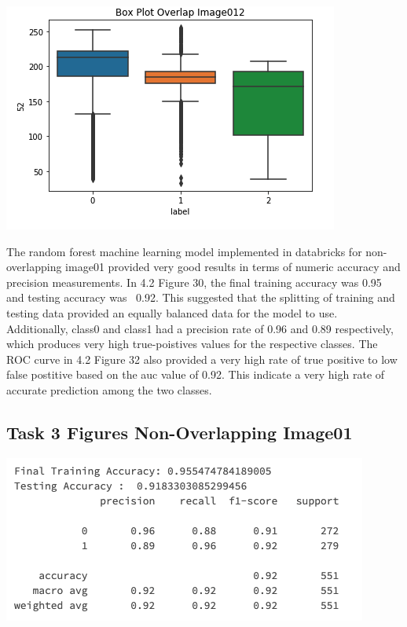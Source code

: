 \documentclass[12pt]{article}
\begin{document}
\begin{multicols*}{2}
\begin{center}
	\includegraphics[scale=0.4]{../screenshot/Pre-Overlapping/box012.png}
  \end{center}

  \hspace*{5mm} The random forest machine learning model implemented in databricks for non-overlapping image01 provided very good results in terms of numeric
  accuracy and precision measurements. In 4.2 Figure 30, the final training accuracy was 0.95 and testing accuracy was ~0.92. This suggested that the splitting of training and testing data provided an equally
  balanced data for the model to use. Additionally, class0 and class1 had a precision rate of 0.96 and 0.89 respectively, which produces very high true-poistives values for the respective classes. 
  The ROC curve in 4.2 Figure 32 also provided a very high rate of true positive to low false postitive based on the auc value of 0.92. This indicate a very high rate of accurate prediction among 
  the two classes.



  \subsection{Task 3 Figures Non-Overlapping Image01}
  \begin{center}
	\includegraphics[scale=0.4]{../screenshot/Non-Overlapping/score01.png}


\end{center}
\end{multicols*}
\end{document}
